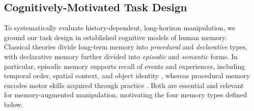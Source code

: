\subsection{Cognitively-Motivated Task Design}
To systematically evaluate history-dependent, long-horizon manipulation, we ground our task design in established cognitive models of human memory. Classical theories \cite{atkinson1968human} divide long-term memory into \textit{procedural} and \textit{declarative} types, with declarative memory further divided into \textit{episodic} and \textit{semantic} forms. In particular, episodic memory supports recall of events and experiences, including temporal order, spatial context, and object identity \cite{burgess2002human, hasselmo2017models, babb2011object}, whereas procedural memory encodes motor skills acquired through practice \cite{squire2004memory}. Both are essential and relevant for memory-augmented manipulation, motivating the four memory types defined below.

